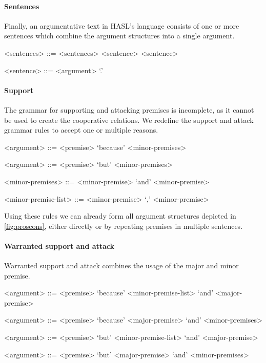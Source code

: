 \paragraph{Sentences} Finally, an argumentative text in HASL's language consists of one or more sentences which combine the argument structures into a single argument.

\begin{grammar}
<sentences> ::= <sentences> <sentence>
    \alt <sentence>

<sentence> ::= <argument> `.'
\end{grammar}

\paragraph{Support} The grammar for supporting and attacking premises is incomplete, as it cannot be used to create the cooperative relations. We redefine the support and attack grammar rules to accept one or multiple reasons.

\begin{grammar}
<argument> ::= <premise> `because' <minor-premises> %

<argument> ::= <premise> `but' <minor-premises> %

<minor-premises> ::= <minor-premise>
 `and' <minor-premise>

<minor-premise-list> ::= <minor-premise>
 `,' <minor-premise>
\end{grammar}

\noindent Using these rules we can already form all argument structures depicted in \autoref{fig:proscons}, either directly or by repeating premises in multiple sentences.

\paragraph{Warranted support and attack} Warranted support and attack combines the usage of the major and minor premise.

\begin{grammar}
<argument> ::= <premise> `because' <minor-premise-list> `and' <major-premise> %

<argument> ::= <premise> `because' <major-premise> `and' <minor-premises> %

<argument> ::= <premise> `but' <minor-premise-list> `and' <major-premise> %

<argument> ::= <premise> `but' <major-premise> `and' <minor-premises> %
\end{grammar}

